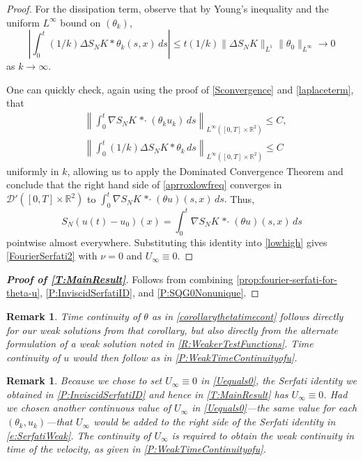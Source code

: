 \documentclass[11pt,reqno,xcolor=svgnames]{amsart}
\def\R{{\mathbb R}}
\theoremstyle{plain}
\theoremstyle{definition}
\theoremstyle{plain}
\newtheorem{remark}[theorem]{Remark}
\theoremstyle{remark}
\newcommand{\abs}[1]{\left\vert#1\right\vert}
\newcommand{\iny}{\ensuremath{\infty}}
\newcommand{\stardot}{{\mathop{* \cdot}}}
\begin{document}
\begin{proof}
For the dissipation term, observe that by Young's inequality and the uniform $L^{\infty}$ bound on $(\theta_k)$,
\begin{equation}\label{laplaceterm}
\abs{\int_0^t(1/k)\Delta S_{N}K\ast\theta_k(s,x) \, ds} \leq t(1/k)\|\Delta S_{N}K \|_{L^1} \|\theta_0\|_{L^{\infty}}   \rightarrow 0  
\end{equation}
as $k\rightarrow\infty$.

One can quickly check, again using the proof of \cref{Sconvergence} and \cref{laplaceterm}, that
\begin{equation*}
\begin{split}
&\left\| \int_0^t \nabla S_N K \stardot (\theta_k u_k) \, ds \right\|_{L^{\infty}([0,T]\times\R^2)} \leq C,\\
& \left\| \int_0^t(1/k)\Delta S_{N}K\ast\theta_k \, ds \right\|_{L^{\infty}([0,T]\times\R^2)} \leq C
\end{split}
\end{equation*}
uniformly in $k$,
allowing us to apply the Dominated Convergence Theorem and conclude that the right hand side of \cref{aprroxlowfreq} converges in $\mathcal{D}'([0,T]\times\R^2)$ to $\int_0^t  \nabla S_{N}K\stardot (\theta u) (s,x)  \, ds.$  Thus, 
$$S_N(u(t) - u_{0})(x) = \int_0^t  \nabla S_{N}K\stardot (\theta u) (s,x)  \, ds$$
pointwise almost everywhere.  Substituting this identity into \cref{lowhigh} gives \cref{FourierSerfati2} with $\nu=0$ and $U_\iny \equiv 0$.
\end{proof}

\begin{proof}[\textbf{Proof of \cref{T:MainResult}}]
    Follows from combining
    \cref{prop:fourier-serfati-for-theta-u}, \ref{P:InviscidSerfatiID}, and \ref{P:SQG0Nonunique}. 
\end{proof}

\begin{remark}\label{R:TimeContinuity}
    Time continuity of $\theta$ as in \cref{corollarythetatimecont} follows directly for our weak solutions from that corollary, but also directly from the alternate formulation of a weak solution noted in \cref{R:WeakerTestFunctions}. Time continuity of $u$ would then follow as in \cref{P:WeakTimeContinuityofu}.
\end{remark}

\begin{remark}\label{R:InviscidSerfatiID}
    Because we chose to set $U_\iny \equiv 0$ in \cref{Uequals0}, the Serfati identity we obtained in \cref{P:InviscidSerfatiID} and hence in \cref{T:MainResult} has $U_\iny \equiv 0$. Had we chosen another continuous value of $U_\iny$ in  \cref{Uequals0}---the same value for each $(\theta_k, u_k)$---that $U_\iny$ would be added to the right side of the Serfati identity in \cref{e:SerfatiWeak}. The continuity of $U_\iny$ is required to obtain the weak continuity in time of the velocity, as given in \cref{P:WeakTimeContinuityofu}.
\end{remark}
\end{document}
